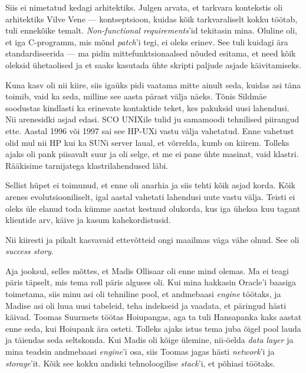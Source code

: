 Siis ei nimetatud kedagi arhitektiks. Julgen arvata, et 
tarkvara kontekstis oli arhitektiks Vilve Vene --- kontseptsioon, kuidas kõik tarkvaraliselt kokku töötab, tuli 
ennekõike temalt. \emph{Non-functional requirements}'id tekitasin mina. 
Oluline oli, et iga C-programm, mis mõnd \emph{patch}'i tegi, ei 
oleks erinev. See tuli kuidagi ära standardiseerida --- ma pidin 
mittefunktsionaalsed nõuded esitama, et need kõik oleksid ühetaolised ja et 
saaks kasutada ühte skripti paljude asjade käivitamiseks.


Kuna kasv oli nii kiire, siis igaüks pidi vaatama mitte ainult 
seda, kuidas asi täna toimib, vaid ka seda, milline see 
aasta pärast välja näeks. Tõnis Sildmäe 
soodustas kindlasti ka erinevate kontaktide teket, kes 
pakuksid uusi lahendusi. Nii arenesidki
asjad edasi. SCO UNIXile tulid ju samamoodi tehnilised piirangud 
ette. Aastal 1996 või 1997 sai see HP-UXi vastu välja vahetatud. Enne 
vahetust olid mul nii HP kui ka SUNi server laual, et võrrelda, kumb on
kiirem. Tolleks ajaks oli pank piisavalt suur ja oli selge, et me ei 
pane ühte masinat, vaid klastri. Rääkisime tarnijatega 
klastrilahendused läbi.

Sellist hüpet ei toimunud, et enne oli anarhia ja siis tehti kõik asjad 
korda. Kõik arenes evolutsiooniliselt, igal aastal vahetati lahendusi uute 
vastu välja. Teisti ei oleks üle elanud toda kümme aastat kestnud olukorda, 
kus iga üheksa kuu tagant klientide arv, käive ja
kasum kahekordistusid.


Nii kiiresti ja pikalt kasvavaid ettevõtteid ongi maailmas väga vähe olnud. See oli \emph{success story}.


Aja jooksul, selles mõttes, et Madis Ollisaar oli 
enne mind olemas. Ma ei teagi päris täpselt, mis tema roll päris alguses oli. 
Kui mina hakkasin Oracle'i baasiga toimetama, siis minu 
asi oli tehniline pool, et andmebaasi \emph{engine} töötaks, ja Madise 
asi oli luua uusi tabeleid, teha indekseid ja vaadata, et päringud hästi 
käivad. Toomas 
Suurmets töötas Hoiupangas, aga 
ta tuli Hansapanka kaks aastat enne seda, kui Hoiupank ära osteti. 
Tolleks ajaks istus tema juba õigel pool lauda ja täiendas seda seltskonda. Kui 
Madis oli kõige ülemine, nii-öelda \emph{data layer} ja mina teadsin 
andmebaasi \emph{engine}'i osa, siis Toomas jagas hästi \emph{network}'i 
ja \emph{storage}'it. Kõik see kokku andiski tehnoloogilise 
\emph{stack}'i, et põhiasi töötaks.


